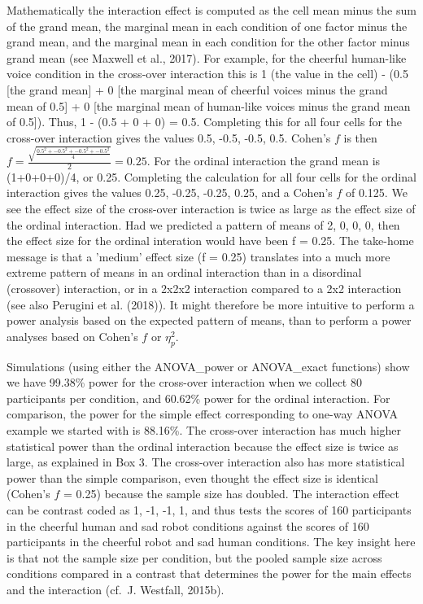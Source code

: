 \documentclass[,man,floatsintext]{apa6}
\begin{document}
\begin{tcolorbox}[colback=black!5!white,colframe=white!5!black,title=Box 3. Calculating effect sizes for interactions]
Mathematically the interaction effect is computed as the cell mean minus the sum of the grand mean, the marginal mean in each condition of one factor minus the grand mean, and the marginal mean in each condition for the other factor minus grand mean (see Maxwell et al., 2017). For example, for the cheerful human-like voice condition in the cross-over interaction this is 1 (the value in the cell) - (0.5 [the grand mean] + 0 [the marginal mean of cheerful voices minus the grand mean of 0.5] + 0 [the marginal mean of human-like voices minus the grand mean of 0.5]). 
Thus, 1 - (0.5 + 0 + 0) = 0.5.
Completing this for all four cells for the cross-over interaction gives the values 0.5, -0.5, -0.5, 0.5.
Cohen's $f$ is then $f = \frac { \sqrt { \frac { 0.5^2 +-0.5^2 + -0.5^2 + -0.5^2 } { 4 } }}{ 2 } = 0.25$.
For the ordinal interaction the grand mean is (1+0+0+0)/4, or 0.25.
Completing the calculation for all four cells for the ordinal interaction gives the values 0.25, -0.25, -0.25, 0.25, and a Cohen's $f$ of 0.125. 
We see the effect size of the cross-over interaction is twice as large as the effect size of the ordinal interaction. 
Had we predicted a pattern of means of 2, 0, 0, 0, then the effect size for the ordinal interation would have been f = 0.25. 
The take-home message is that a 'medium' effect size (f = 0.25) translates into a much more extreme pattern of means in an ordinal interaction than in a disordinal (crossover) interaction, or in a 2x2x2 interaction compared to a 2x2 interaction (see also Perugini et al. (2018)).
It might therefore be more intuitive to perform a power analysis based on the expected pattern of means, than to perform a power analyses based on Cohen's $f$ or $\eta_p^2$.
\end{tcolorbox}

Simulations (using either the ANOVA\_power or ANOVA\_exact functions) show we have 99.38\% power for the cross-over interaction when we collect 80 participants per condition, and 60.62\% power for the ordinal interaction.
For comparison, the power for the simple effect corresponding to one-way ANOVA example we started with is 88.16\%.
The cross-over interaction has much higher statistical power than the ordinal interaction because the effect size is twice as large, as explained in Box 3.
The cross-over interaction also has more statistical power than the simple comparison, even thought the effect size is identical (Cohen's \(f\) = 0.25) because the sample size has doubled.
The interaction effect can be contrast coded as 1, -1, -1, 1, and thus tests the scores of 160 participants in the cheerful human and sad robot conditions against the scores of 160 participants in the cheerful robot and sad human conditions.
The key insight here is that not the sample size per condition, but the pooled sample size across conditions compared in a contrast that determines the power for the main effects and the interaction (cf.~J. Westfall, 2015b).
\end{document}
